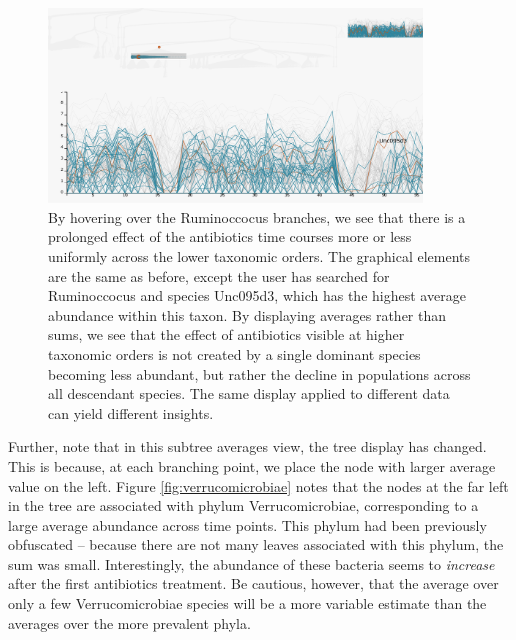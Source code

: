 \documentclass[12pt]{article}
\begin{document}
\begin{figure}

{\centering \includegraphics[width=375px]{figure/ruminococcus}

}

\caption{By hovering over the Ruminoccocus branches, we see that there is a
  prolonged effect of the antibiotics time courses more or less uniformly across
  the lower taxonomic orders. The graphical elements are the same as before,
  except the user has searched for Ruminoccocus and species Unc095d3, which has
  the highest average abundance within this taxon. By displaying averages rather
  than sums, we see that the effect of antibiotics visible at higher taxonomic
  orders is not created by a single dominant species becoming less abundant, but
  rather the decline in populations across all descendant species. The same
  display applied to different data can yield different
  insights.}\label{fig:ruminococcus}
\end{figure}

Further, note that in this subtree averages view, the tree display has changed.
This is because, at each branching point, we place the node with larger average
value on the left. Figure \ref{fig:verrucomicrobiae} notes that the nodes at
the far left in the tree are associated with phylum Verrucomicrobiae,
corresponding to a large average abundance across time points. This phylum had
been previously obfuscated -- because there are not many leaves associated with
this phylum, the sum was small. Interestingly, the abundance of these bacteria
seems to \emph{increase} after the first antibiotics treatment. Be cautious,
however, that the average over only a few Verrucomicrobiae species will be a
more variable estimate than the averages over the more prevalent phyla.
\end{document}
